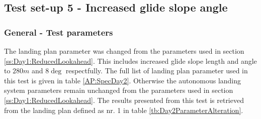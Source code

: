 \subsection{Test set-up 5 - Increased glide slope angle}\label{ss:Day2GlideSlope}
\subsubsection{General - Test parameters}
The landing plan parameter was changed from the parameters used in section \ref{ss:Day1:ReducedLookahead}. This includes increased glide slope length and angle to $280 m$ and $8 \deg$ respectfully. The full list of landing plan parameter used in this test is given in table \ref{AP:SpecDay2}. Otherwise the autonomous landing system parameters remain unchanged from the parameters used in section \ref{ss:Day1:ReducedLookahead}. The results presented from this test is retrieved from the landing plan defined as nr. 1 in table \ref{tb:Day2ParameterAlteration}.
